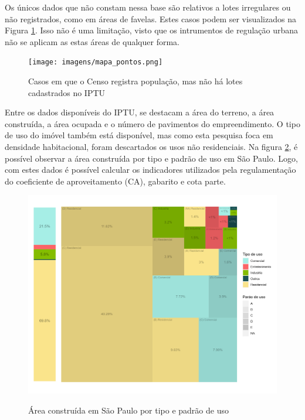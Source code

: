 Os únicos dados que não constam nessa base são relativos a lotes irregulares ou não registrados, como em áreas de favelas. Estes casos podem ser visualizados na Figura \ref{fig:pontos_erro}. Isso não é uma limitação, visto que os intrumentos de regulação urbana não se aplicam as estas áreas de qualquer forma.

\begin{figure}[h]
    \centering
    \caption{Casos em que o Censo registra população, mas não há lotes cadastrados no IPTU}
    \bigskip
    \texttt{[image: imagens/mapa\_pontos.png]}
    \label{fig:pontos_erro}
\end{figure}

Entre os dados disponíveis do IPTU, se destacam a área do terreno, a área construída, a área ocupada e o número de pavimentos do empreendimento. O tipo de uso do imóvel também está disponível, mas como esta pesquisa foca em densidade habitacional, foram descartados os usos não residenciais. Na figura \ref{fig:area_construida}, é possível observar a área construída por tipo e padrão de uso em São Paulo. Logo, com estes dados é possível calcular os indicadores utilizados pela regulamentação do coeficiente de aproveitamento (CA), gabarito e cota parte.

\begin{figure}[h]
    \centering
    \caption{Área construída em São Paulo por tipo e padrão de uso}
    \includegraphics[width = \linewidth]{imagens/tree_area_construida.png}
    \label{fig:area_construida}
\end{figure}

